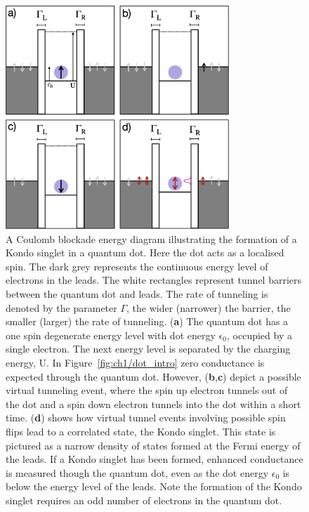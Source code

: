 \begin{figure}[!hbt]
 \begin{center}
  \includegraphics[width=0.75\textwidth]{figures/ch2/crop_FiguresMaster.010.png}
  \caption[Kondo effect in a quantum dot: Coulomb blockade energy diagrams]{\label{fig:ch2/kondo_dot_diagram} 
  A Coulomb blockade energy diagram illustrating the formation of a Kondo singlet in a quantum dot. Here the dot acts as a localised spin. The dark grey represents the continuous energy level of electrons in the leads. The white rectangles represent tunnel barriers between the quantum dot and leads. The rate of tunneling is denoted by the parameter $\Gamma$, the wider (narrower) the barrier, the smaller (larger) the rate of tunneling. (\textbf{a}) The quantum dot has a one spin degenerate energy level with dot energy $\mathrm{\epsilon_0}$, occupied by a single electron. The next energy level is separated by the charging energy, $\mathrm{U}$. In Figure~\ref{fig:ch1/dot_intro} zero conductance is expected through the quantum dot. However, (\textbf{b},\textbf{c}) depict a possible virtual tunneling event, where the spin up electron tunnels out of the dot and a spin down electron tunnels into the dot within a short time. (\textbf{d}) shows how virtual tunnel events involving possible spin flips lead to a correlated state, the Kondo singlet. This state is pictured as a narrow density of states formed at the Fermi energy of the leads. If a Kondo singlet has been formed, enhanced conductance is measured though the quantum dot, even as the dot energy $\epsilon_0$ is below the energy level of the leads. Note the formation of the Kondo singlet requires an odd number of electrons in the quantum dot.
   }
 \end{center}
\end{figure}


